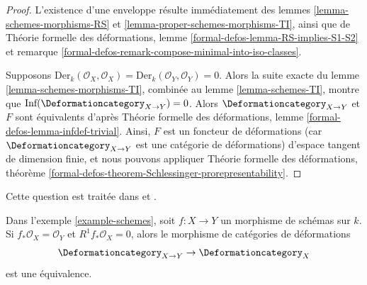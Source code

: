 \begin{proof}
L'existence d'une enveloppe résulte immédiatement des
lemmes \ref{lemma-schemes-morphisms-RS} et
\ref{lemma-proper-schemes-morphisms-TI}, ainsi que de
Théorie formelle des déformations, lemme \ref{formal-defos-lemma-RS-implies-S1-S2}
et remarque \ref{formal-defos-remark-compose-minimal-into-iso-classes}.

\medskip\noindent
Supposons $\text{Der}_k(\mathcal{O}_X, \mathcal{O}_X) =
\text{Der}_k(\mathcal{O}_Y, \mathcal{O}_Y) = 0$. Alors
la suite exacte du lemme \ref{lemma-schemes-morphisms-TI},
combinée au lemme \ref{lemma-schemes-TI},
montre que $\text{Inf}(\Deformationcategory_{X \to Y}) = 0$.
Alors $\Deformationcategory_{X \to Y}$ et $F$ sont équivalents d'après
Théorie formelle des déformations, lemme \ref{formal-defos-lemma-infdef-trivial}.
Ainsi, $F$ est un foncteur de déformations (car
$\Deformationcategory_{X \to Y}$ est une
catégorie de déformations) d'espace tangent de dimension finie, et nous pouvons appliquer
Théorie formelle des déformations, théorème
\ref{formal-defos-theorem-Schlessinger-prorepresentability}.
\end{proof}

\begin{lemma}
\label{lemma-schemes-morphisms-smooth-to-base}
\begin{reference}
Cette question est traitée dans \cite[Section 5.3]{Ravi-Murphys-Law} et
\cite[Theorem 3.3]{Ran-deformations}.
\end{reference}
Dans l'exemple \ref{example-schemes}, soit $f : X \to Y$ un morphisme de schémas
sur $k$. Si $f_*\mathcal{O}_X = \mathcal{O}_Y$ et $R^1f_*\mathcal{O}_X = 0$,
alors le morphisme de catégories de déformations
$$
\Deformationcategory_{X \to Y} \to \Deformationcategory_X
$$
est une équivalence.
\end{lemma}

